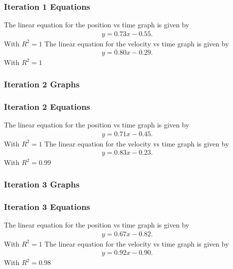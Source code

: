 \documentclass{report}
\begin{document}
    \bigbreak \noindent 
    \subsubsection{Iteration 1 Equations}
    \bigbreak \noindent 
    The linear equation for the position vs time graph is given by
    \begin{align*}
        y=0.73x-0.55
    .\end{align*}
    With $R^{2} = 1$
    \bigbreak \noindent 
    The linear equation for the velocity vs time graph is given by
    \begin{align*}
        y=0.80x-0.29
    .\end{align*}
    With $R^{2} = 1$

    \bigbreak \noindent 
    \subsubsection{Iteration 2 Graphs}
    \fc{}


    \bigbreak \noindent 
    \subsubsection{Iteration 2 Equations}
    The linear equation for the position vs time graph is given by
    \begin{align*}
        y = 0.71x -0.45 
    .\end{align*}
    With $R^{2} = 1$
    \bigbreak \noindent 
    The linear equation for the velocity vs time graph is given by
    \begin{align*}
        y=0.83x-0.23
    .\end{align*}
    With $R^{2} = 0.99$

    \bigbreak \noindent 
    \subsubsection{Iteration 3 Graphs}
    \fc{}


    \bigbreak \noindent 
    \subsubsection{Iteration 3 Equations}
    The linear equation for the position vs time graph is given by
    \begin{align*}
        y = 0.67x -0.82 
    .\end{align*}
    With $R^{2} = 1$
    \bigbreak \noindent 
    The linear equation for the velocity vs time graph is given by
    \begin{align*}
        y=0.92x-0.90
    .\end{align*}
    With $R^{2} = 0.98$
\end{document}
